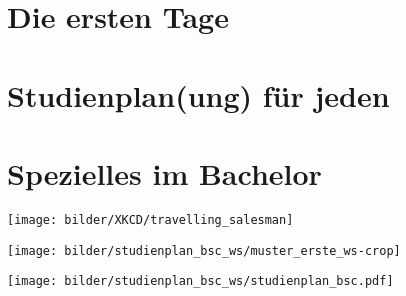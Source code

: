 \documentclass[]{papertex}
\begin{document}
	\thispagestyle{empty}
	\clearpage
	\setcounter{page}{1}
	\tableofcontents
	\newpage
	\section{Die ersten Tage}
	\newpage
	\section{Studienplan(ung) für jeden}
		\label{studienplan}
		\begin{multicols}{2}
%		
		\end{multicols}
	\newpage
	\section{Spezielles im Bachelor}
		\label{bachelor}
		\newpage
		\begin{multicols}{2}
		\end{multicols}
		\begin{center}
		\texttt{[image: bilder/XKCD/travelling\_salesman]}
		\end{center}
		\begin{minipage}{1.0\linewidth}
			\begin{center}     
			\label{musterstudienplan}
			\texttt{[image: bilder/studienplan\_bsc\_ws/muster\_erste\_ws-crop]}
			\end{center}  
		\end{minipage}
		\newpage
		\begin{minipage}{1.0\linewidth}
		\begin{center} 
  			\texttt{[image: bilder/studienplan\_bsc\_ws/studienplan\_bsc.pdf]}
  			\label{studienplan_neu}
		\end{center}
		\end{minipage}
	\newpage
\end{document}
